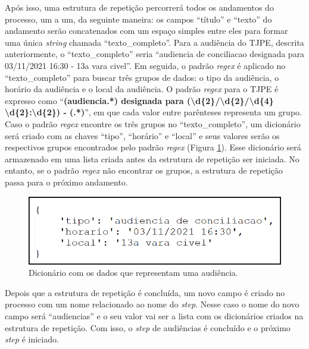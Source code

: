 Após isso, uma estrutura de repetição percorrerá todos os andamentos do processo, um a um, da seguinte maneira: os campos \enquote{título} e \enquote{texto} do andamento serão concatenados com um espaço simples entre eles para formar uma única \textit{string} chamada \enquote{texto\_completo}. Para a audiência do TJPE, descrita anteriormente, o \enquote{texto\_completo} seria \enquote{audiencia de conciliacao designada para 03/11/2021 16:30 - 13a vara civel}. Em seguida, o padrão \textit{regex} é aplicado no \enquote{texto\_completo} para buscar três grupos de dados: o tipo da audiência, o horário da audiência e o local da audiência. O padrão \textit{regex} para o TJPE é expresso como \enquote{\textbf{(audiencia.*) designada para (\textbackslash d\{2\}/\textbackslash d\{2\}/\textbackslash d\{4\} \textbackslash d\{2\}:\textbackslash d\{2\}) - (.*)}}, em que cada valor entre parênteses representa um grupo. Caso o padrão \textit{regex} encontre os três grupos no \enquote{texto\_completo}, um dicionário será criado com as chaves \enquote{tipo}, \enquote{horário} e \enquote{local} e seus valores serão os respectivos grupos encontrados pelo padrão \textit{regex} (Figura \ref{fig:dictAudiencia}). Esse dicionário será armazenado em uma lista criada antes da estrutura de repetição ser iniciada. No entanto, se o padrão \textit{regex} não encontrar os grupos, a estrutura de repetição passa para o próximo andamento.

\begin{figure}[ht]
\centering
\includegraphics[width=.8\textwidth]{imagens/audiencia.png}
\caption{Dicionário com os dados que representam uma audiência.}
\label{fig:dictAudiencia}
\end{figure}

Depois que a estrutura de repetição é concluída, um novo campo é criado no processo com um nome relacionado ao nome do \textit{step}. Nesse caso o nome do novo campo será \enquote{audiencias} e o seu valor vai ser a lista com os dicionários criados na estrutura de repetição. Com isso, o \textit{step} de audiências é concluído e o próximo \textit{step} é iniciado.


